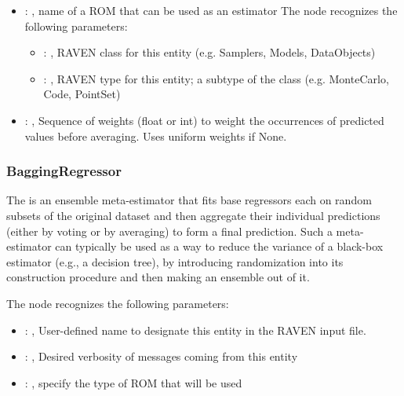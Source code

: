 \begin{itemize}
    \item {}: , 
      name of a ROM that can be used as an estimator
      The  node recognizes the following parameters:
        \begin{itemize}
          \item {}: , 
            RAVEN class for this entity (e.g. Samplers, Models, DataObjects)
          \item {}: , 
            RAVEN type for this entity; a subtype of the class (e.g. MonteCarlo, Code, PointSet)
      \end{itemize}

    \item {}: , 
      Sequence of weights (float or int) to weight the occurrences of predicted
      values before averaging. Uses uniform weights if None.
  \end{itemize}


\subsubsection{BaggingRegressor}
  The  is an ensemble meta-estimator that fits base regressors each on
  random subsets of the original                             dataset and then aggregate their
  individual predictions (either by voting or by averaging) to form a final
  prediction. Such a meta-estimator can typically be used as a way to reduce the variance of a
  black-box estimator                             (e.g., a decision tree), by introducing
  randomization into its construction procedure and then making an ensemble
  out of it.

  The  node recognizes the following parameters:
    \begin{itemize}
      \item {}: , 
        User-defined name to designate this entity in the RAVEN input file.
      \item {}: , 
        Desired verbosity of messages coming from this entity
      \item {}: , 
        specify the type of ROM that will be used
  \end{itemize}

